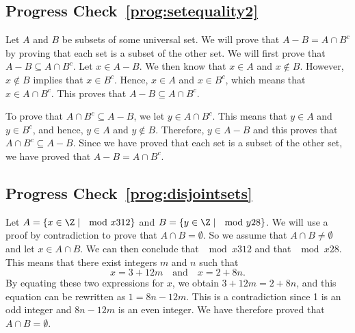 \subsection*{Progress Check~\ref{prog:setequality2}}
\begin{myproof}
Let  $A$  and  $B$  be subsets of some universal set.  We will prove that $A - B = A \cap B^c$ by proving that each set is a subset of the other set.  We will first prove that $A - B \subseteq A \cap B^c$.  Let 
$x \in A - B$.  We then know that $x \in A$ and $x \notin B$.  However, $x \notin B$ implies that $x \in B^c$.  Hence, $x \in A$ and $x \in B^c$, which means that $x \in A \cap B^c$.  This proves that 
$A - B \subseteq A \cap B^c$.

To prove that $A \cap B^c \subseteq A - B$, we let $y \in A \cap B^c$.  This means that $y \in A$ and 
$y \in B^c$, and hence, $y \in A$ and $y \notin B$.  Therefore, $y \in A - B$ and this proves that $A \cap B^c \subseteq A - B$.  Since we have proved that each set is a subset of the other set, we have proved that 
$A - B = A \cap B^c$.
\end{myproof}



\subsection*{Progress Check~\ref{prog:disjointsets}}
\begin{myproof}
Let $A = \{ x \in \Z \mid \mod{x}{3}{12} \}$ and  $B = \{ y \in \Z \mid \mod{y}{2}{8} \}$.  We will use a proof by contradiction to prove that $A \cap B = \emptyset$.  So we assume that $A \cap B \ne \emptyset$ and let $x \in A \cap B$.  We can then conclude that $\mod{x}{3}{12}$ and that $\mod{x}{2}{8}$.  This means that there exist integers $m$ and $n$ such that
\[
x = 3 + 12m \quad \text{and} \quad x = 2 + 8n.
\]
By equating these two expressions for $x$, we obtain $3 + 12m = 2 + 8n$, and this equation can be rewritten as $1 = 8n - 12m$.  This is a contradiction since 1 is an odd integer and $8n - 12m$ is an even integer.  We have therefore proved that $A \cap B = \emptyset$.
\end{myproof}
\hbreak

\endinput
